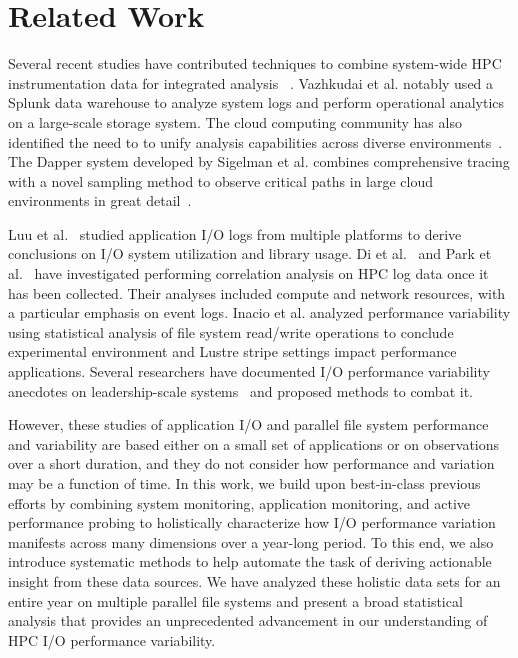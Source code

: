 \section{Related Work} \label{sec:related}

Several recent studies have contributed techniques to combine
system-wide HPC instrumentation data for integrated
analysis~\cite{Lockwood2017,Vazhkudai2017guide,Agelastos2014ldms,Kunkel2014siox,RIOT_2013}
. Vazhkudai et al. notably used a Splunk data warehouse to analyze system
logs and perform operational analytics on a large-scale storage system.
The cloud computing community has also identified the need to to unify
analysis capabilities across diverse environments~\cite{Vazhkudai2017guide}. The Dapper system
developed by Sigelman et al. combines comprehensive tracing with a novel
sampling method to observe critical paths in large cloud environments in great
detail~\cite{Sigelman2010dapper}.

Luu et al.~\cite{Luu:2015:HPDC} studied application I/O logs from multiple platforms to derive conclusions on I/O system utilization and library usage. Di et al.~\cite{7973730} and Park et al.~\cite{Park2017BigDM} have
investigated performing correlation analysis on HPC log data once it has been
collected.  Their analyses included compute and network resources, with a
particular emphasis on event logs. Inacio et al. analyzed performance variability using statistical analysis of file system read/write operations to conclude experimental environment and Lustre stripe settings impact performance applications. 
Several researchers have documented 
I/O performance variability anecdotes on leadership-scale
systems~\cite{Lofstead2010,Yildiz2016,carns2011understanding} and proposed
methods to combat it.  

However, these studies of application I/O and parallel file system performance and variability are based either on a small set of applications or on observations over a short duration, and they do not consider how performance and variation may be a function of time.
In this work, we build upon best-in-class previous efforts by combining system monitoring, application monitoring, and active performance probing
to holistically characterize how I/O performance variation manifests across many dimensions over a year-long period.
To this end, we also introduce systematic methods to help automate the task of deriving actionable insight from these data sources.
We have analyzed these holistic data sets for an entire year on multiple parallel file systems and present a broad statistical analysis that provides an unprecedented advancement in our understanding of HPC I/O performance variability.
